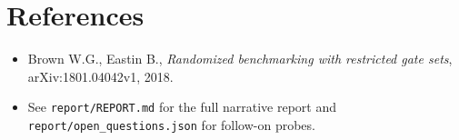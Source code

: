 \documentclass[11pt]{article}
\begin{document}
\section{References}
\begin{itemize}
  \item Brown W.G., Eastin B., \emph{Randomized benchmarking with restricted
    gate sets}, arXiv:1801.04042v1, 2018.
  \item See \texttt{report/REPORT.md} for the full narrative report and
    \texttt{report/open\_questions.json} for follow-on probes.
\end{itemize}
\end{document}
